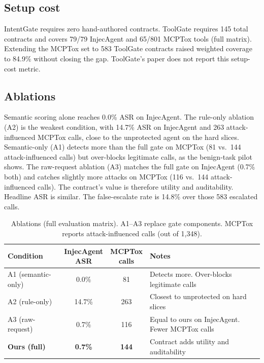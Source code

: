 \documentclass[a4paper,conference]{IEEEtran}
\begin{document}
\subsection{Setup cost}
IntentGate requires zero hand-authored contracts. ToolGate requires 145 total contracts and covers 79/79 InjecAgent and 65/801 MCPTox tools (full matrix). Extending the MCPTox set to 583 ToolGate contracts raised weighted coverage to 84.9\% without closing the gap. ToolGate's paper does not report this setup-cost metric.

\subsection{Ablations}
Semantic scoring alone reaches 0.0\% ASR on InjecAgent. The rule-only ablation (A2) is the weakest condition, with 14.7\% ASR on InjecAgent and 263 attack-influenced MCPTox calls, close to the unprotected agent on the hard slices. Semantic-only (A1) detects more than the full gate on MCPTox (81 vs.\ 144 attack-influenced calls) but over-blocks legitimate calls, as the benign-task pilot shows. The raw-request ablation (A3) matches the full gate on InjecAgent (0.7\% both) and catches slightly more attacks on MCPTox (116 vs.\ 144 attack-influenced calls). The contract's value is therefore utility and auditability. Headline ASR is similar. The false-escalate rate is 14.8\% over those 583 escalated calls.

\begin{table}[t]
  \caption{Ablations (full evaluation matrix). A1--A3 replace gate components. MCPTox reports attack-influenced calls (out of 1{,}348).}
  \label{tab:ablation}
  \centering
  \footnotesize
  \setlength{\tabcolsep}{4pt}
  \begin{tabular}{|l|c|c|p{88pt}|}
    \hline
    Condition            & \shortstack{InjecAgent                                                                         \\ASR} & \shortstack{MCPTox\\calls} & Notes \\
    \hline
    A1 (semantic-only)   & 0.0\%                  & 81           & Detects more. Over-blocks legitimate calls             \\
    \hline
    A2 (rule-only)       & 14.7\%                 & 263          & Closest to unprotected on hard slices                  \\
    \hline
    A3 (raw-request)     & 0.7\%                  & 116          & Equal to ours on \mbox{InjecAgent}. Fewer MCPTox calls \\
    \hline
    \textbf{Ours (full)} & \textbf{0.7\%}         & \textbf{144} & Contract adds utility and auditability                 \\
    \hline
  \end{tabular}
\end{table}
\end{document}
